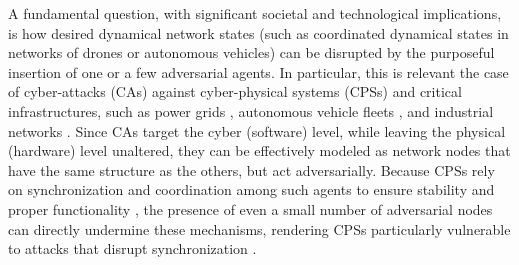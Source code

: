 \documentclass[%
 reprint,
 amsmath,amssymb,
 aip,
]{revtex4-2}
\theoremstyle{italichead}
\theoremstyle{definition}
\begin{document}
A fundamental question, with significant societal and technological implications, is  how desired dynamical network states (such as coordinated dynamical states in networks of drones or autonomous vehicles) can be
disrupted by the purposeful insertion of one or a few
{adversarial} agents. %
In particular, this is relevant the 
case of cyber-attacks (CAs)  against
cyber-physical systems (CPSs) and critical infrastructures, such as power grids \cite{pagani2013power}, autonomous vehicle fleets \cite{ren2007information}, and industrial networks \cite{hearnshaw2013complex}. 
Since CAs target the cyber (software) level, while leaving the physical (hardware) level unaltered, they can be effectively modeled as network nodes that have the same structure as the others, but act adversarially.  Because CPSs rely on synchronization and coordination among such agents to ensure stability and proper functionality \cite{zhang2011optimal}, the presence of even a small number of adversarial nodes can directly undermine these mechanisms, rendering CPSs particularly vulnerable to attacks that disrupt synchronization \cite{pasqualetti2013attack}.  
\end{document}
